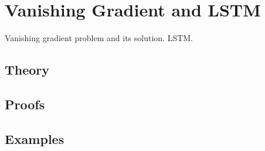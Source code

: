 
\section{Vanishing Gradient and LSTM}
\label{sec:1.4.12-vanishing-gradient-lstm}

\begin{ticket}
Vanishing gradient problem and its solution. LSTM.
\end{ticket}

\subsection*{Theory}

\subsection*{Proofs}

\subsection*{Examples}
